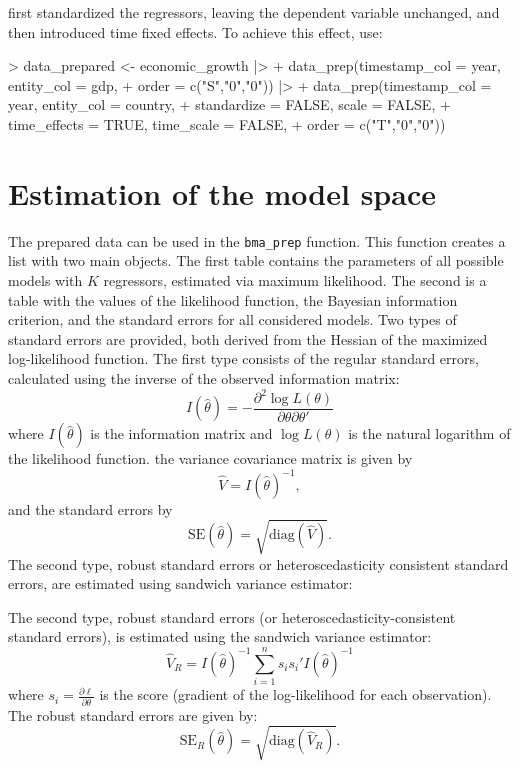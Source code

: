 \documentclass[a4paper]{article}
\begin{document}
\citet{Moral+2016} first standardized the regressors, leaving the dependent variable unchanged, and then introduced time fixed effects. To achieve this effect, use:
\begin{Schunk}
\begin{Sinput}
> data_prepared <- economic_growth |>
+     data_prep(timestamp_col = year, entity_col = gdp,
+               order = c("S","0","0")) |>
+     data_prep(timestamp_col = year, entity_col = country,
+               standardize = FALSE, scale = FALSE,
+               time_effects = TRUE, time_scale = FALSE,
+               order = c("T","0","0"))
\end{Sinput}
\end{Schunk}

\section{Estimation of the model space}\label{model_space}
The prepared data can be used in the \verb+bma_prep+ function. This function creates a list with two main objects. The first table contains the parameters of all possible models with $K$ regressors, estimated via maximum likelihood. The second is a table with the values of the likelihood function, the Bayesian information criterion, and the standard errors for all considered models. Two types of standard errors are provided, both derived from the Hessian of the maximized log-likelihood function. The first type consists of the regular standard errors, calculated using the inverse of the observed information matrix:
\begin{equation}
I(\hat{\theta}) = -\frac{\partial^2 \log L(\theta)}{\partial \theta \partial \theta'}
\end{equation}
where $I(\hat{\theta})$ is the information matrix and $\log L(\theta)$ is the natural logarithm of the likelihood function. the variance covariance matrix is given by
\begin{equation}
\hat{V} = I(\hat{\theta})^{-1},
\end{equation}
and the standard errors by
\begin{equation}
\text{SE}(\hat{\theta}) = \sqrt{\text{diag}(\hat{V})}.
\end{equation}
The second type, robust standard errors or heteroscedasticity consistent standard errors, are estimated using sandwich variance estimator:

The second type, robust standard errors (or heteroscedasticity-consistent standard errors), is estimated using the sandwich variance estimator:
\begin{equation}
\hat{V}_{R} = I(\hat{\theta})^{-1} \sum_{i=1}^{n} s_i s_i' I(\hat{\theta})^{-1}
\end{equation}
where $s_i = \frac{\partial \ell}{\partial \theta}$ is the score (gradient of the log-likelihood for each observation).
The robust standard errors are given by:
\begin{equation}
\text{SE}_{R}(\hat{\theta}) = \sqrt{\text{diag}(\hat{V}_{R})}.
\end{equation}
\end{document}
